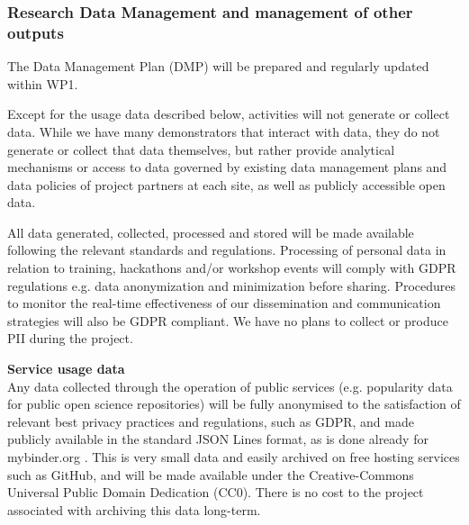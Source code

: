 
\TOWRITE{}{}

\subsubsection{Research Data Management and management of other outputs}

The Data Management Plan (DMP) will be prepared and regularly updated within WP1.

Except for the usage data described below,
\TheProject activities will not generate or collect data.
While we have many demonstrators that interact with data, they do not generate or collect that
data themselves, but rather provide analytical mechanisms or access to data governed by
existing data management plans and data policies of project partners at each site,
as well as publicly accessible open data.

All data generated, collected, processed and stored will be made available following the
relevant standards and regulations. Processing of personal data in relation to training,
hackathons and/or workshop events will comply with GDPR regulations e.g. data
anonymization and minimization before sharing.
Procedures to monitor the real-time effectiveness of our dissemination and
communication strategies will also be GDPR compliant.
We have no plans to collect or produce PII during the project.

\noindent \textbf{Service usage data} \\
Any data collected through the operation of public services
(e.g. popularity data for public open science repositories)
will be fully anonymised to the satisfaction of relevant best privacy practices and regulations, such as GDPR,
and made publicly available in the standard JSON Lines format,
as is done already for mybinder.org \cite{mybinder-archive}.
This is very small data and easily archived on free hosting services such as GitHub,
and will be made available under the Creative-Commons Universal Public Domain Dedication (CC0).
There is no cost to the project associated with archiving this data long-term.



